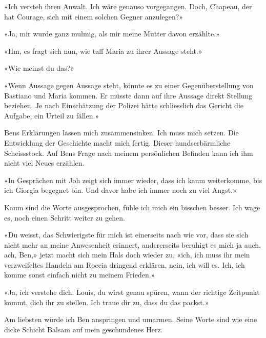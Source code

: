 «Ich versteh ihren Anwalt. Ich wäre genauso vorgegangen. Doch, Chapeau,
der hat Courage, sich mit einem solchen Gegner anzulegen?»

«Ja, mir wurde ganz mulmig, als mir meine Mutter davon erzählte.»

«Hm, es fragt sich nun, wie taff Maria zu ihrer Aussage steht.»

«Wie meinst du das?»

«Wenn Aussage gegen Aussage steht, könnte es zu einer Gegenüberstellung
von Bastiano und Maria kommen. Er müsste dann auf ihre Aussage direkt
Stellung beziehen. Je nach Einschätzung der Polizei hätte schliesslich
das Gericht die Aufgabe, ein Urteil zu fällen.»

Bens Erklärungen lassen mich zusammensinken. Ich muss mich setzen. Die
Entwicklung der Geschichte macht mich fertig. Dieser hundserbärmliche
Scheissstock.
Auf Bens Frage nach meinem persönlichen Befinden kann ich ihm nicht viel
Neues erzählen.

«In Gesprächen mit Joh zeigt sich immer wieder, dass ich kaum
weiterkomme, bis ich Giorgia begegnet bin. Und davor habe ich immer noch
zu viel Angst.»

Kaum sind die Worte ausgesprochen, fühle ich mich ein bisschen besser.
Ich wage es, noch einen Schritt weiter zu gehen.

«Du weisst, das Schwierigste für mich ist einerseits nach wie vor, dass
sie sich nicht mehr an meine Anwesenheit erinnert, andererseits beruhigt
es mich ja auch, ach, Ben,» jetzt macht sich mein Hals doch wieder zu,
«ich, ich muss ihr mein verzweifeltes Handeln am Roccia dringend
erklären, nein, ich will es. Ich, ich komme sonst einfach nicht zu
meinem Frieden.»

«Ja, ich verstehe dich. Louis, du wirst genau spüren, wann der richtige
Zeitpunkt kommt, dich ihr zu stellen. Ich traue dir zu, dass du das
packst.»

Am liebsten würde ich Ben anspringen und umarmen. Seine Worte sind wie
eine dicke Schicht Balsam auf mein geschundenes Herz.
